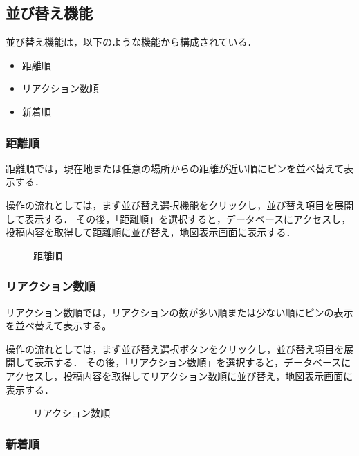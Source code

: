 \subsection{並び替え機能}
並び替え機能は，以下のような機能から構成されている．

\begin{itemize}
    \item 距離順
    \item リアクション数順
    \item 新着順
\end{itemize}

\subsubsection{距離順}

距離順では，現在地または任意の場所からの距離が近い順にピンを並べ替えて表示する．

操作の流れとしては，まず並び替え選択機能をクリックし，並び替え項目を展開して表示する．
その後，「距離順」を選択すると，データベースにアクセスし，投稿内容を取得して距離順に並び替え，地図表示画面に表示する．



\begin{figure}[H]
    \centering
    
    \caption{距離順}
\end{figure}

\subsubsection{リアクション数順}

リアクション数順では，リアクションの数が多い順または少ない順にピンの表示を並べ替えて表示する。

操作の流れとしては，まず並び替え選択ボタンをクリックし，並び替え項目を展開して表示する．
その後，「リアクション数順」を選択すると，データベースにアクセスし，投稿内容を取得してリアクション数順に並び替え，地図表示画面に表示する．


\begin{figure}[H]
    \centering
    
    \caption{リアクション数順}
\end{figure}


\subsubsection{新着順}

